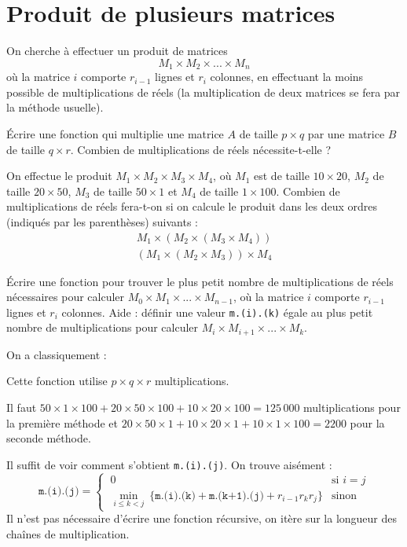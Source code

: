 \renewcommand{\SourceFile}{8-vers-la-recursivite/src/8-2.ml}

\section{Produit de plusieurs matrices}

On cherche à effectuer un produit de matrices
\[
    M_1 \times M_2 \times ... \times M_n
\]
où la matrice $i$ comporte $r_{i-1}$ lignes et $r_i$ colonnes, en effectuant la moins possible de multiplications de réels (la multiplication de deux matrices se fera par la méthode usuelle).

\Q
Écrire une fonction qui multiplie une matrice $A$ de taille $p \times q$ par une matrice $B$ de taille $q \times r$. Combien de multiplications de réels nécessite-t-elle ?

\Q
On effectue le produit $M_1 \times M_2 \times M_3 \times M_4$, où $M_1$ est de taille $10 \times 20$, $M_2$ de taille $20 \times 50$, $M_3$ de taille $50 \times 1$ et $M_4$ de taille $1 \times 100$. Combien de multiplications de réels fera-t-on si on calcule le produit dans les deux ordres (indiqués par les parenthèses) suivants :
\[
\begin{split}
    M_1 \times (M_2 \times (M_3 \times M_4))\\[6pt]
    (M_1 \times (M_2 \times M_3)) \times M_4
\end{split}
\]

\Q
Écrire une fonction pour trouver le plus petit nombre de multiplications de réels nécessaires pour calculer $M_0 \times M_1 \times ... \times M_{n-1}$, où la matrice $i$ comporte $r_{i-1}$ lignes et $r_i$ colonnes. Aide : définir une valeur \texttt{m.(i).(k)} égale au plus petit nombre de multiplications pour calculer $M_i \times M_{i+1} \times ... \times M_k$.

\Corrige

\Q
On a classiquement :



Cette fonction utilise $p \times q \times r$ multiplications.

\Q
Il faut $50\times1\times100 + 20\times50\times100 + 10\times20\times100 = 125\,000$ multiplications pour la première méthode et $20\times50\times1 + 10\times20\times1 + 10\times1\times100 = 2200$ pour la seconde méthode.

\Q
Il suffit de voir comment s'obtient \texttt{m.(i).(j)}. On trouve aisément :
\[
    \texttt{m.(i).(j)} = \begin{cases}
        \ 0 & \textrm{si } i=j \\
        \ \min_{i \leq k < j}\ \{\texttt{m.(i).(k)} + \texttt{m.(k+1).(j)} + r_{i-1}r_kr_j\} & \textrm{sinon}
      \end{cases}
\]
Il n'est pas nécessaire d'écrire une fonction récursive, on itère sur la longueur des chaînes de multiplication.



\Fin
